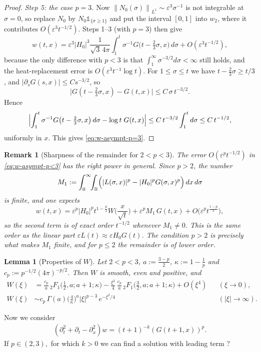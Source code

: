 \documentclass[11pt]{amsart}
\newtheorem{lemma}{Lemma}[section]
\newtheorem{remark}{Remark}[section]
\theoremstyle{definition}
\theoremstyle{remark}
\numberwithin{equation}{section}
\newcommand{\R}{{\mathbb R}}
\newcommand{\pt}{\partial}
\newcommand{\ep}{\varepsilon}
\newcommand{\norm}[1]{\left\lVert #1\right\rVert}
\begin{document}
\begin{proof}
\medskip
\noindent\emph{Step 5: the case $p=3$.}
Now $\norm{N_0(\sigma)}_{L^1}\sim\ep^3\sigma^{-1}$ is not integrable at
$\sigma=0$, so replace $N_0$ by $N_0\mathds 1_{\{\sigma\ge1\}}$ and put
the interval $[0,1]$ into $w_2$, where it contributes $O(\ep^3t^{-1/2})$.
Steps 1--3 (with $p=3$) then give
\[
w(t,x)=\ep^3|H_0|^3\frac{1}{\sqrt3\,4\pi}\int_1^t\sigma^{-1}
G\bigl(t-\tfrac23\sigma,x\bigr)\,d\sigma+O(\ep^3t^{-1/2}),
\]
because the only difference with $p<3$ is that $\int_1^\infty\sigma^{-3/2}d\sigma<\infty$
still holds, and the heat-replacement error is $O(\ep^3t^{-1}\log t)$.
For $1\le\sigma\le t$ we have $t-\tfrac23\sigma\ge t/3$, and
$|\pt_sG(s,x)|\le Cs^{-3/2}$, so
\[
\bigl|G(t-\tfrac23\sigma,x)-G(t,x)\bigr|\le C\,\sigma\,t^{-3/2}.
\]
Hence
\[
\Bigl|\int_1^t\sigma^{-1}G\bigl(t-\tfrac23\sigma,x\bigr)\,d\sigma-\log t\;G(t,x)\Bigr|
\le C\,t^{-3/2}\int_1^t d\sigma\le C\,t^{-1/2},
\]
uniformly in $x$. This gives \eqref{eq:w-asympt-p=3}.
\end{proof}

\begin{remark}[Sharpness of the remainder for $2<p<3$]\label{rem:sharp}
The error $O(\ep^pt^{-1/2})$ in \eqref{eq:w-asympt-p<3} has the right power in
general. Since $p>2$, the number
\[
M_1:=\int_0^\infty\!\!\int_{\R}\Bigl(|L(\sigma,x)|^p-|H_0|^pG(\sigma,x)^p\Bigr)\,dx\,d\sigma
\]
is finite, and one expects
\[
w(t,x)=\ep^p|H_0|^pt^{1-\frac p2}W\Big(\frac{x}{\sqrt t}\Big)
+\ep^pM_1\,G(t,x)+O\bigl(\ep^pt^{\frac{1-p}{2}}\bigr),
\]
so the second term is of exact order $t^{-1/2}$ whenever $M_1\neq0$. This is the same
order as the linear part $\ep L(t)\approx\ep H_0G(t)$. The condition $p>2$ is precisely
what makes $M_1$ finite, and for $p\le2$ the remainder is of lower order.
\end{remark}

\begin{lemma}[Properties of $W$]\label{lem:W}
Let $2<p<3$, $a:=\frac{3-p}{2}$, $\kappa:=1-\frac1p$ and $c_p:=p^{-1/2}(4\pi)^{-p/2}$. Then $W$ is smooth, even and positive, and
\begin{align}
W(\xi)&=\frac{c_p}{a}\,{}_2F_1\!\Big(\tfrac12,a;a+1;\kappa\Big)
-\frac{\xi^2}{4}\,\frac{c_p}{a}\,{}_2F_1\!\Big(\tfrac32,a;a+1;\kappa\Big)+O(\xi^4)
&&(\xi\to0),\\
W(\xi)&\sim c_p\,\Gamma(a)\Big(\frac{4}{\kappa}\Big)^{a}|\xi|^{p-3}\,e^{-\xi^2/4}
&&(|\xi|\to\infty).
\end{align}
\end{lemma}


Now we consider \begin{equation}
    \begin{aligned}
        (\partial_t^2+\partial_t-\partial_x^2)w
=
(t+1)^{-k} (G(t+1,x))^p.
    \end{aligned}
\end{equation}
If $p \in (2,3),$ for which $k>0$ we can find a solution with leading term ?
\end{document}
